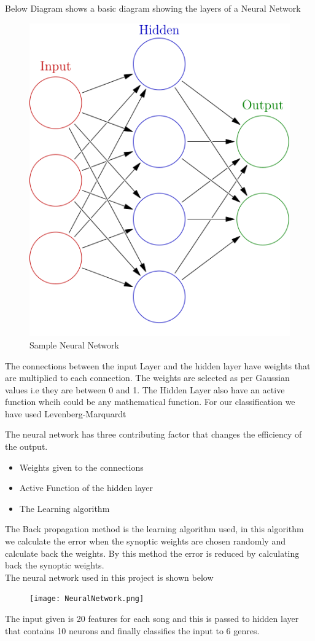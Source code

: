 \documentclass[12pt]{article}
\begin{document}
Below Diagram shows a basic diagram showing the layers of a Neural Network
\begin{figure}[H]
\center
\includegraphics [scale=0.5]{ann.png}
\caption{Sample Neural Network}
\end{figure}
The connections between the input Layer and the hidden layer have weights that are multiplied to each connection. The weights are selected as per Gaussian values i.e they are between 0 and 1.
The Hidden Layer also have an active function whcih could be any mathematical function. For our classification we have used Levenberg-Marquardt


The neural network has three contributing factor that changes the efficiency of the output.
\begin{itemize}
  \item Weights given to the connections
  \item Active Function of the hidden layer
   \item The Learning algorithm
   \end{itemize}
 The Back propagation method is the learning algorithm used, in this algorithm we calculate the error when the synoptic weights are chosen randomly and calculate back the weights. By this method the error is reduced by calculating back the synoptic weights.\\
 The neural network used in this project is shown below
 \begin{figure}[H]
\texttt{[image: NeuralNetwork.png]}
\end{figure}
The input given is 20 features for each song and this is passed to hidden layer that contains 10 neurons and finally classifies the input to 6 genres.
\end{document}
